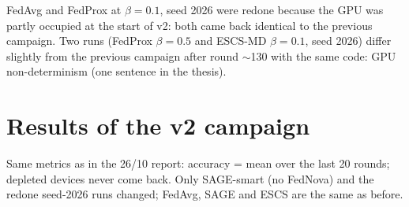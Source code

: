 \documentclass[11pt,a4paper]{article}
\begin{document}
FedAvg and FedProx at $\beta=0.1$, seed 2026 were redone because the GPU was
partly occupied at the start of v2: both came back identical to the previous
campaign. Two runs (FedProx $\beta=0.5$ and ESCS-MD $\beta=0.1$, seed 2026)
differ slightly from the previous campaign after round $\sim$130 with the same
code: GPU non-determinism (one sentence in the thesis).

\section{Results of the v2 campaign}
\label{sec:results}

Same metrics as in the 26/10 report: accuracy = mean over the last 20 rounds;
depleted devices never come back. Only SAGE-smart (no FedNova) and the redone
seed-2026 runs changed; FedAvg, SAGE and ESCS are the same as before.
\end{document}
